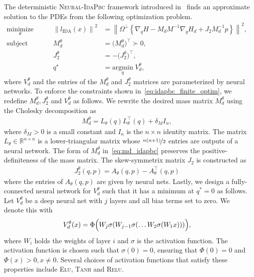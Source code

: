 The deterministic \textsc{Neural-IdaPbc} framework introduced
in~\cite{sirichotiyakul2022data} finds an approximate solution to the PDEs from the
following optimization problem.
\begin{equation}
  \begin{aligned}
      \underset{\theta }{\textrm{minimize}} 
      &&\quad \left\| l_{\textrm{IDA}} (x) \right\|^2 &= \left\| \Omega^\perp \left\{ \nabla_qH - M_dM^{-1} \nabla_qH_d + J_2M_d^{-1}p \right\} \right\|^2, \\
      \textrm{subject to}
      &&\quad M_d^\theta &= \big( M_d^\theta \big)^\top \succ 0, \\
      &&\quad J_2^\theta &= -\big( J_2^\theta \big)^\top, \\
      &&\quad q^\star &= \underset{q}{\textrm{argmin}}\; V_d^\theta,
  \end{aligned}    
  \label{eq:idapbc_finite_optim}%
\end{equation}
where $V^\theta_d$ and the entries of the $M^\theta_d$ and $J^\theta_2$ matrices
are parameterized by neural networks. 
%
To enforce the constraints shown in~\eqref{eq:idapbc_finite_optim}, we redefine
$M^\theta_d, J^\theta_2$ and $V^\theta_d$ as follows.
%
We rewrite the desired mass matrix $M^\theta_d$ using the Cholesky decomposition as
\begin{align}
  M^\theta_d = L_{\theta}(q)L_{\theta}^\top(q) + \delta_M I_n,
  \label{eq:md_idapbc}
\end{align}
\noindent where $\delta_M > 0$ is a small constant and $I_n$ is the $n \times n$
identity matrix.
%
The matrix $L_{\theta} \in \mathbb{R}^{n \times n}$ is a lower-triangular matrix
whose $\nicefrac{n(n+1)}{2}$ entries are outputs of a neural network. 
%
The form of $M_d^\theta$ in~\eqref{eq:md_idapbc} preserves the
positive-definiteness of the mass matrix.
%
The skew-symmetrix matrix $J_2$ is constructed as 
\begin{align*}
  J_2^\theta(q, p) = A_\theta(q, p) - A^\top_\theta(q, p)
\end{align*}
\noindent where the entries of $A_{\theta}(q, p)$ are given by neural nets.
%
Lastly, we design a fully-connected neural network for $V^\theta_d$ such that it
has a minimum at $q^*=0$ as follows.
%
Let $V^\theta_d$ be a deep neural net with $j$ layers and all bias terms set to
zero. We denote this with
\begin{equation}
  V_d^\theta(x) = \Phi \Bigl( W_j\sigma(W_{j-1}\sigma(\ldots W_2\sigma(W_1x))) \Bigr),
  \label{eq:Vdnet_constraint}
\end{equation}
\noindent where $W_i$ holds the weights of layer $i$ and $\sigma$ is the activation function.
%
The activation function is chosen such that $\sigma(0) = 0$, ensuring that
$\Phi(0) = 0$ and $\Phi(x) > 0, x \ne 0$.
%
Several choices of activation functions that satisfy these properties include
\textsc{Elu}, \textsc{Tanh} and \textsc{Relu}.
%


